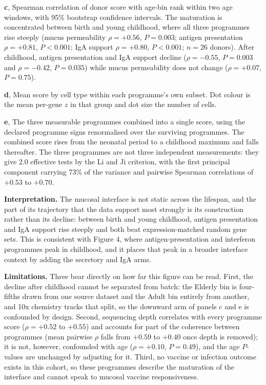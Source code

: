 \documentclass[11pt]{article}
\begin{document}
\textbf{c}, Spearman correlation of donor score with age-bin rank within two age windows,
with 95\% bootstrap confidence intervals. The maturation is concentrated between birth and
young childhood, where all three programmes rise steeply (mucus permeability $\rho = +0.56$,
$P = 0.003$; antigen presentation $\rho = +0.81$, $P < 0.001$; IgA support $\rho = +0.80$,
$P < 0.001$; $n = 26$ donors). After childhood, antigen presentation and IgA support decline
($\rho = -0.55$, $P = 0.003$ and $\rho = -0.42$, $P = 0.035$) while mucus permeability does
not change ($\rho = +0.07$, $P = 0.75$).

\textbf{d}, Mean score by cell type within each programme's own subset. Dot colour is the mean
per-gene $z$ in that group and dot size the number of cells.

\textbf{e}, The three measurable programmes combined into a single score, using the declared programme
signs renormalised over the surviving programmes. The combined score rises from the neonatal period
to a childhood maximum and falls thereafter. The three programmes are not three independent
measurements: they give 2.0 effective tests by the Li and Ji criterion, with the first
principal component carrying 73\% of the variance and pairwise Spearman correlations of
$+0.53$ to $+0.70$.

\vspace{6pt}
\textbf{Interpretation.} The mucosal interface is not static across the lifespan, and the
part of its trajectory that the data support most strongly is its construction rather than
its decline: between birth and young childhood, antigen presentation and IgA support rise
steeply and both beat expression-matched random gene sets. This is consistent with Figure 4,
where antigen-presentation and interferon programmes peak in childhood, and it places that
peak in a broader interface context by adding the secretory and IgA arms.

\textbf{Limitations.} Three bear directly on how far this figure can be read. First, the
decline after childhood cannot be separated from batch: the Elderly bin is four-fifths drawn
from one source dataset and the Adult bin entirely from another, and 10x chemistry tracks
that split, so the downward arm of panels c and e is confounded by design. Second, sequencing
depth correlates with every programme score ($\rho = +0.52$ to $+0.55$) and accounts for part of
the coherence between programmes (mean pairwise $\rho$ falls from $+0.59$ to $+0.40$ once depth is
removed); it is not, however, confounded with age ($\rho = +0.10$, $P = 0.49$), and the age
$P$-values are unchanged by adjusting for it. Third, no vaccine or infection outcome exists in
this cohort, so these programmes describe the maturation of the interface and cannot speak to
mucosal vaccine responsiveness.
\end{document}
